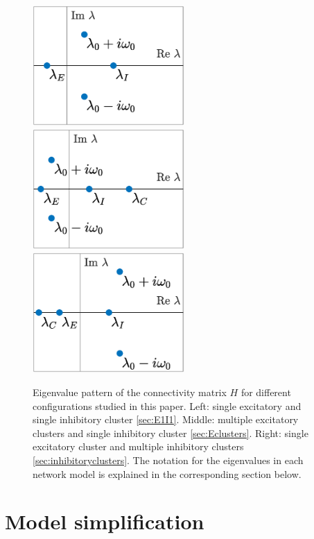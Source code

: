 \documentclass[reqno]{siamonline190516}
\begin{document}
\begin{figure}
    \centering
    \includegraphics[width=5.8cm]{eigpattern1.eps} \hspace{-0.7cm}
    \includegraphics[width=5.8cm]{eigpattern2.eps} \hspace{-0.7cm}
    \includegraphics[width=5.8cm]{eigpattern3.eps} 
    \caption{Eigenvalue pattern of the connectivity matrix $H$ for different configurations studied in this paper. Left: single excitatory and single inhibitory cluster \cref{sec:E1I1}. Middle:  multiple excitatory clusters and single inhibitory cluster \cref{sec:Eclusters}. Right: single excitatory cluster and multiple inhibitory clusters \cref{sec:inhibitoryclusters}. The notation for the eigenvalues in each network model is explained in the corresponding section below.}
    \label{fig:Heigpattern}
\end{figure}

\section{Model simplification}\label{sec:simplermodel}
\end{document}
